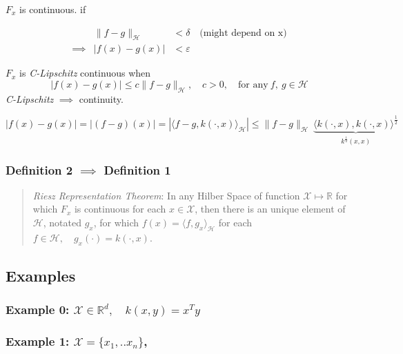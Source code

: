 \documentclass[10pt,portrait]{article}
\begin{document}
\(F_x\) is continuous. if

\begin{eqnarray*}
&\|f-g\|_{\mathcal{H}}&<\delta \quad\text{(might depend on x)}\\ \implies &|f(x)-g(x)| & <  \varepsilon
\end{eqnarray*}

\(F_x\) is \emph{C-Lipschitz} continuous when
\[|f(x)-g(x)|  \le  c\|f-g\|_{\mathcal{H}},\quad c>0, \quad\text{for any}\ f,\ g\in\mathcal{H}\]
\emph{C-Lipschitz} \(\implies\) continuity.

\[|f(x)-g(x)|=|(f-g)(x)|=|\langle f-g,k(\cdot,x)\rangle_{\mathcal{H}}|\le  \|f-g\|_{\mathcal{H}}\ \underbrace{\langle k(\cdot,x),k(\cdot,x)\rangle^{\frac12}}_{k^{\frac12}(x,x)}\]

\hypertarget{definition-2-implies-definition-1}{%
\subsubsection{\texorpdfstring{Definition 2 \(\implies\) Definition
1}{Definition 2 \textbackslash{}implies Definition 1}}\label{definition-2-implies-definition-1}}

\begin{quote}
\emph{Riesz Representation Theorem}: In any Hilber Space of function
\(\mathcal{X}\mapsto\mathbb{R}\) for which \(F_x\) is continuous for
each \(x\in\mathcal{X}\), then there is an unique element of
\(\mathcal{H}\), notated \(g_x\), for which
\(f(x)=\langle f,g_x\rangle_\mathcal{H}\) for each
\(f\in\mathcal{H},\quad g_x(\cdot)=k(\cdot,x)\).
\end{quote}

\hypertarget{examples}{%
\subsection{Examples}\label{examples}}

\hypertarget{example-0-mathcalxinmathbbrdquad-kxyxty-1}{%
\subsubsection{\texorpdfstring{Example 0:
\(\mathcal{X}\in\mathbb{R}^d,\quad k(x,y)=x^Ty\)}{Example 0: \textbackslash{}mathcal\{X\}\textbackslash{}in\textbackslash{}mathbb\{R\}\^{}d,\textbackslash{}quad k(x,y)=x\^{}Ty}}\label{example-0-mathcalxinmathbbrdquad-kxyxty-1}}

\hypertarget{example-1-mathcalxx_1..x_n}{%
\subsubsection{\texorpdfstring{Example 1:
\(\mathcal{X}=\{x_1,..x_n\}\),}{Example 1: \textbackslash{}mathcal\{X\}=\textbackslash{}\{x\_1,..x\_n\textbackslash{}\},}}\label{example-1-mathcalxx_1..x_n}}
\end{document}
